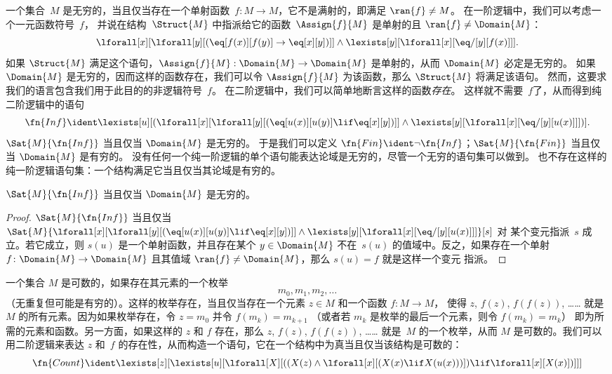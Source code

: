 \documentclass[../../../include/open-logic-section]{subfiles}
\begin{document}


一个集合~$M$ 是无穷的，当且仅当存在一个单射函数~$f\colon M \to M$，它不是满射的，即满足 $\ran{f} \neq M$。
在一阶逻辑中，我们可以考虑一个一元函数符号~$f$，
并说在结构~$\Struct{M}$ 中指派给它的函数~$\Assign{f}{M}$ 是单射的且 $\ran{f} \neq \Domain{M}$：
\[
\lforall[x][\lforall[y][(\eq[f(x)][f(y)] \to \eq[x][y])]] \land
\lexists[y][\lforall[x][\eq/[y][f(x)]]].
\]
如果 $\Struct{M}$ 满足这个语句，$\Assign{f}{M}:
\Domain{M} \to \Domain{M}$ 是单射的，从而 $\Domain{M}$ 必定是无穷的。
如果 $\Domain{M}$ 是无穷的，因而这样的函数存在，我们可以令 $\Assign{f}{M}$ 为该函数，那么 $\Struct{M}$ 将满足该语句。
然而，这要求我们的语言包含我们用于此目的的非逻辑符号~$f$。
在二阶逻辑中，我们可以简单地断言这样的函数\emph{存在}。
这样就不需要~$f$了，从而得到纯二阶逻辑中的语句
\[
\fn{Inf} \ident \lexists[u][(\lforall[x][\lforall[y][(\eq[u(x)][u(y)]
      \lif \eq[x][y])]] \land \lexists[y][\lforall[x][\eq/[y][u(x)]]])].
\]
$\Sat{M}{\fn{Inf}}$ 当且仅当 $\Domain{M}$ 是无穷的。
于是我们可以定义 $\fn{Fin} \ident \lnot \fn{Inf}$；$\Sat{M}{\fn{Fin}}$ 当且仅当 $\Domain{M}$ 是有穷的。
没有任何一个纯一阶逻辑的单个语句能表达论域是无穷的，尽管一个无穷的语句集可以做到。
也不存在这样的纯一阶逻辑语句集：一个结构满足它当且仅当其论域是有穷的。

\begin{prop}
$\Sat{M}{\fn{Inf}}$ 当且仅当 $\Domain{M}$ 是无穷的。
\end{prop}

\begin{proof}
$\Sat{M}{\fn{Inf}}$ 当且仅当
  $\Sat{M}{\lforall[x][\lforall[y][(\eq[u(x)][u(y)] \lif \eq[x][y])]]
    \land \lexists[y][\lforall[x][\eq/[y][u(x)]]]}[s]$ 对
  某个变元指派~$s$ 成立。若它成立，则 $s(u)$ 是一个单射函数，并且存在某个 $y
  \in \Domain{M}$ 不在~$s(u)$ 的值域中。反之，如果存在一个单射 $f\colon \Domain{M} \to \Domain{M}$ 且其值域 $\ran{f}
  \neq \Domain{M}$，那么 $s(u) = f$ 就是这样一个变元
  指派。
\end{proof}

一个集合 $M$ 是可数的，如果存在其元素的一个枚举
\[
m_0, m_1, m_2, \dots
\]
（无重复但可能是有穷的）。这样的枚举存在，当且仅当存在一个元素 $z \in M$ 和一个函数 $f\colon M \to M$，
使得 $z$, $f(z)$, $f(f(z))$, …… 就是~$M$ 的所有元素。因为如果枚举存在，令 $z = m_0$ 并令 $f(m_k) = m_{k+1}$ （或者若 $m_k$ 是枚举的最后一个元素，则令 $f(m_k) = m_k$）
即为所需的元素和函数。另一方面，如果这样的 $z$ 和 $f$ 存在，那么 $z$, $f(z)$, $f(f(z))$, …… 就是~$M$ 的一个枚举，从而 $M$ 是可数的。我们可以用二阶逻辑来表达 $z$ 和~$f$ 的存在性，从而构造一个语句，它在一个结构中为真当且仅当该结构是可数的：
\[
\fn{Count} \ident
\lexists[z][\lexists[u][\lforall[X][((X(z) \land
      \lforall[x][(X(x) \lif X(u(x)))]) \lif \lforall[x][X(x)])]]]
\]
\end{document}
